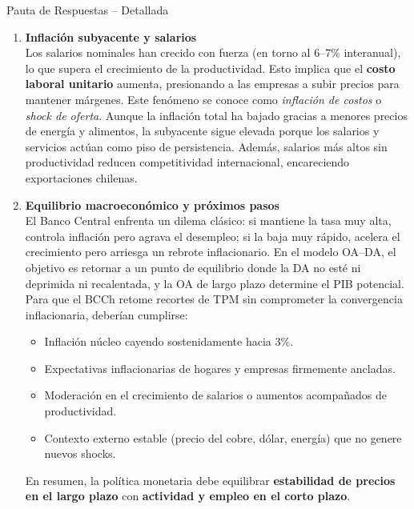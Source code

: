 \documentclass[11pt,addpoints]{article}
\begin{document}
\begin{frame}{Pauta de Respuestas -- Detallada}
\begin{enumerate}[label=(\alph*),leftmargin=*]
\item \textbf{Inflación subyacente y salarios} \\
Los salarios nominales han crecido con fuerza (en torno al 6–7\% interanual), lo que supera el crecimiento de la productividad.  
Esto implica que el \textbf{costo laboral unitario} aumenta, presionando a las empresas a subir precios para mantener márgenes.  
Este fenómeno se conoce como \emph{inflación de costos} o \emph{shock de oferta}.  
Aunque la inflación total ha bajado gracias a menores precios de energía y alimentos, la subyacente sigue elevada porque los salarios y servicios actúan como piso de persistencia.  
Además, salarios más altos sin productividad reducen competitividad internacional, encareciendo exportaciones chilenas.


\item \textbf{Equilibrio macroeconómico y próximos pasos} \\
El Banco Central enfrenta un dilema clásico: si mantiene la tasa muy alta, controla inflación pero agrava el desempleo; si la baja muy rápido, acelera el crecimiento pero arriesga un rebrote inflacionario.  
En el modelo OA--DA, el objetivo es retornar a un punto de equilibrio donde la DA no esté ni deprimida ni recalentada, y la OA de largo plazo determine el PIB potencial.  
Para que el BCCh retome recortes de TPM sin comprometer la convergencia inflacionaria, deberían cumplirse:  
\begin{itemize}
  \item Inflación núcleo cayendo sostenidamente hacia 3\%.  
  \item Expectativas inflacionarias de hogares y empresas firmemente ancladas.  
  \item Moderación en el crecimiento de salarios o aumentos acompañados de productividad.  
\newpage %
\vspace*{0.1cm} %

  \item Contexto externo estable (precio del cobre, dólar, energía) que no genere nuevos shocks.  
\end{itemize}
En resumen, la política monetaria debe equilibrar \textbf{estabilidad de precios en el largo plazo} con \textbf{actividad y empleo en el corto plazo}.
\end{enumerate}
\end{frame}
\end{document}
